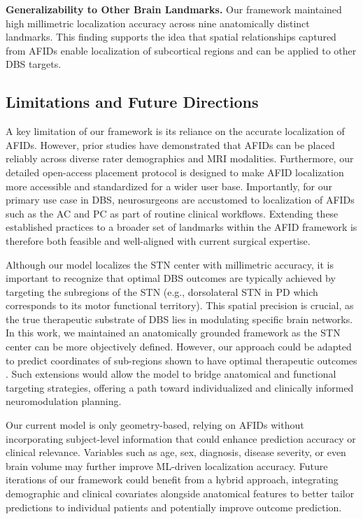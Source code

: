 \textbf{Generalizability to Other Brain Landmarks.} Our framework maintained high millimetric localization accuracy across nine anatomically distinct landmarks. This finding supports the idea that spatial relationships captured from AFIDs enable localization of subcortical regions and can be applied to other DBS targets.

\subsection{Limitations and Future Directions}
A key limitation of our framework is its reliance on the accurate localization of AFIDs. However, prior studies have demonstrated that AFIDs can be placed reliably across diverse rater demographics and MRI modalities. Furthermore, our detailed open-access placement protocol is designed to make AFID localization more accessible and standardized for a wider user base. Importantly, for our primary use case in DBS, neurosurgeons are accustomed to localization of AFIDs such as the AC and PC as part of routine clinical workflows. Extending these established practices to a broader set of landmarks within the AFID framework is therefore both feasible and well-aligned with current surgical expertise.

Although our model localizes the STN center with millimetric accuracy, it is important to recognize that optimal DBS outcomes are typically achieved by targeting the subregions of the STN (e.g., dorsolateral STN in PD which corresponds to its motor functional territory). This spatial precision is crucial, as the true therapeutic substrate of DBS lies in modulating specific brain networks. In this work, we maintained an anatomically grounded framework as the STN center can be more objectively defined. However, our approach could be adapted to predict coordinates of sub-regions shown to have optimal therapeutic outcomes \cite{Hollunder2024-wc}. Such extensions would allow the model to bridge anatomical and functional targeting strategies, offering a path toward individualized and clinically informed neuromodulation planning.

Our current model is only geometry-based, relying on AFIDs without incorporating subject-level information that could enhance prediction accuracy or clinical relevance. Variables such as age, sex, diagnosis, disease severity, or even brain volume may further improve ML-driven localization accuracy. Future iterations of our framework could benefit from a hybrid approach, integrating demographic and clinical covariates alongside anatomical features to better tailor predictions to individual patients and potentially improve outcome prediction.

